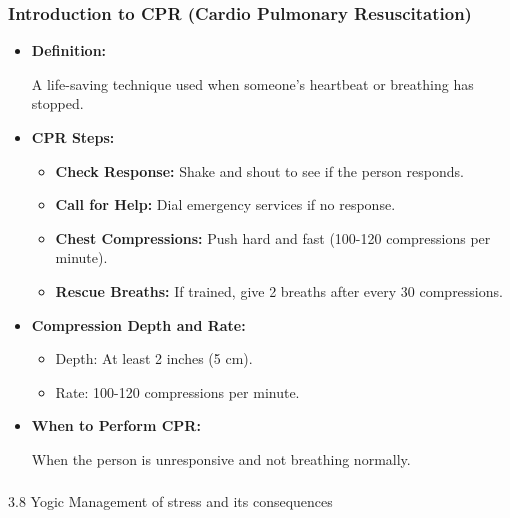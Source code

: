\begin{frame}[fragile]\frametitle{Introduction to CPR (Cardio Pulmonary Resuscitation)}

      \begin{itemize}
        \item \textbf{Definition:} 
        
        A life-saving technique used when someone’s heartbeat or breathing has stopped.
        
        \item \textbf{CPR Steps:} 
        \begin{itemize}
            \item \textbf{Check Response:} Shake and shout to see if the person responds.
            \item \textbf{Call for Help:} Dial emergency services if no response.
            \item \textbf{Chest Compressions:} Push hard and fast (100-120 compressions per minute).
            \item \textbf{Rescue Breaths:} If trained, give 2 breaths after every 30 compressions.
        \end{itemize}
        \item \textbf{Compression Depth and Rate:} 
        \begin{itemize}
            \item Depth: At least 2 inches (5 cm).
            \item Rate: 100-120 compressions per minute.
        \end{itemize}
        \item \textbf{When to Perform CPR:} 
        
        When the person is unresponsive and not breathing normally.
        
      \end{itemize}

\end{frame}

\begin{frame}[fragile]\frametitle{}
\begin{center}
{\Large 3.8 Yogic Management of stress and its consequences}
\end{center}
\end{frame}

